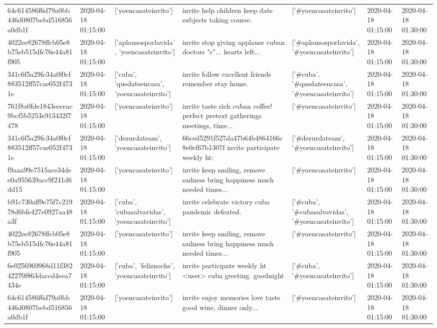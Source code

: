\begin{tabular}{lllllll}
64c614586f6d79a0bb446d0807bebd516856a0db1f & 2020-04-18 01:15:00 & ['yoencasateinvito'] & invite help children keep date subjects taking course. & ['#yoencasateinvito'] & 2020-04-18 01:15:00 & 2020-04-18 01:30:00 \\
4022ee82678ffcb05e8b75eb515dfc76e44a81f905 & 2020-04-18 01:15:00 & ['aplausosporlavida', 'yoencasateinvito'] & invite stop giving applause cuban doctors "c"... hearts left... & ['#aplausosporlavida', '#yoencasateinvito'] & 2020-04-18 01:15:00 & 2020-04-18 01:30:00 \\
341c6f5a29fc34a0f0cf883512ff57cae052f4731e & 2020-04-18 01:15:00 & ['cuba', 'quedateencasa', 'yoencasateinvito'] & invite follow excellent friends remember stay home. & ['#cuba', '#quedateencasa', '#yoencasateinvito'] & 2020-04-18 01:15:00 & 2020-04-18 01:30:00 \\
761f8a0fde1843eeceac9bcf5b5253e913432f7478 & 2020-04-18 01:15:00 & ['yoencasateinvito'] & invite taste rich cuban coffee! perfect pretext gatherings meetings, time... & ['#yoencasateinvito'] & 2020-04-18 01:15:00 & 2020-04-18 01:30:00 \\
341c6f5a29fc34a0f0cf883512ff57cae052f4731e & 2020-04-18 01:15:00 & ['dezurdateam', 'yoencasateinvito'] & 66ced5291f527da47b64b4864166c8e0cf67b1307f invite participate weekly ht: & ['#dezurdateam', '#yoencasateinvito'] & 2020-04-18 01:15:00 & 2020-04-18 01:30:00 \\
f9aaa99e7515ace34dee0a955639acc9f241d6dd15 & 2020-04-18 01:15:00 & ['yoencasateinvito'] & invite keep smiling, remove sadness bring happiness much needed times... & ['#yoencasateinvito'] & 2020-04-18 01:15:00 & 2020-04-18 01:30:00 \\
b91c730aff9e75f7c21978d6bfe427e0927aa48a3f & 2020-04-18 01:15:00 & ['cuba', 'cubasalvavidas', 'yoencasateinvito'] & invite celebrate victory cuba pandemic defeated. & ['#cuba', '#cubasalvavidas', '#yoencasateinvito'] & 2020-04-18 01:15:00 & 2020-04-18 01:30:00 \\
4022ee82678ffcb05e8b75eb515dfc76e44a81f905 & 2020-04-18 01:15:00 & ['yoencasateinvito'] & invite keep smiling, remove sadness bring happiness much needed times... & ['#yoencasateinvito'] & 2020-04-18 01:15:00 & 2020-04-18 01:30:00 \\
6e0256969968d11f38242270f863daccd4eea7434e & 2020-04-18 01:15:00 & ['cuba', 'feliznoche', 'yoencasateinvito'] & invite participate weekly ht <user> cuba greeting. goodnight & ['#cuba', '#yoencasateinvito'] & 2020-04-18 01:15:00 & 2020-04-18 01:30:00 \\
64c614586f6d79a0bb446d0807bebd516856a0db1f & 2020-04-18 01:15:00 & ['yoencasateinvito'] & invite enjoy memories love taste good wine, dinner only... & ['#yoencasateinvito'] & 2020-04-18 01:15:00 & 2020-04-18 01:30:00 \\

\end{tabular}
